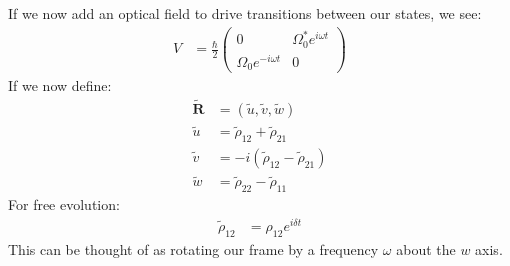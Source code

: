 If we now add an optical field to drive transitions between our states, we see:
\begin{align*}
	V &= \frac{\hbar}{2} \begin{pmatrix}
		0 & \Omega_0^* e^{i\omega t} \\
		\Omega_0 e^{-i\omega t} & 0
		      \end{pmatrix}
\end{align*}
If we now define:
\begin{align*}
	\tilde{\bm{R}} &= (\tilde{u},\tilde{v},\tilde{w}) \\
	\tilde{u} &= \tilde{\rho}_{12} + \tilde{\rho}_{21} \\
	\tilde{v} &= -i(\tilde{\rho}_{12} - \tilde{\rho}_{21}) \\
	\tilde{w} &= \tilde{\rho}_{22} - \tilde{\rho}_{11}
\end{align*}
For free evolution:
\begin{align*}
	\tilde{\rho}_{12} &= \rho_{12} e^{i\delta t}
\end{align*}
This can be thought of as rotating our frame by a frequency $\omega$ about the $w$ axis.

